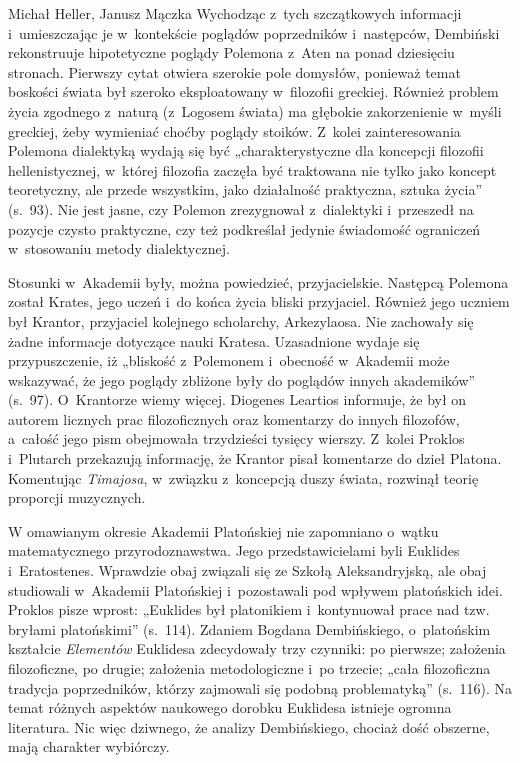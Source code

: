 \begin{recplenv}{Michał Heller, Janusz Mączka}
Wychodząc z~tych szczątkowych informacji i~umieszczając je w~kontekście poglądów
poprzedników i~następców, Dembiński rekonstruuje hipotetyczne poglądy Polemona z~Aten na ponad dziesięciu stronach.
Pierwszy cytat otwiera szerokie pole domysłów, ponieważ temat boskości świata był szeroko eksploatowany w~filozofii
greckiej. Również problem życia zgodnego z~naturą (z~Logosem świata) ma głębokie zakorzenienie w~myśli greckiej, żeby
wymieniać choćby poglądy stoików. Z~kolei zainteresowania Polemona dialektyką wydają się być „charakterystyczne dla
koncepcji filozofii hellenistycznej, w~której filozofia zaczęła być traktowana nie tylko jako koncept teoretyczny, ale
przede wszystkim, jako działalność praktyczna, sztuka życia” (s.~93). Nie jest jasne, czy Polemon zrezygnował
 z~dialektyki i~przeszedł na pozycje czysto praktyczne, czy też podkreślał jedynie świadomość ograniczeń w~stosowaniu
metody dialektycznej.

\enlargethispage{-.5\baselineskip}
Stosunki w~Akademii były, można powiedzieć, przyjacielskie. Następcą Polemona
został Krates, jego uczeń i~do końca życia bliski przyjaciel. Również jego uczniem był Krantor, przyjaciel kolejnego
scholarchy, Arkezylaosa. Nie zachowały się żadne informacje dotyczące nauki Kratesa. Uzasadnione wydaje się
przypuszczenie, iż „bliskość z~Polemonem i~obecność w~Akademii może wskazywać, że jego poglądy zbliżone były do
poglądów innych akademików” (s.~97). O~Krantorze wiemy więcej. Diogenes Leartios informuje, że był on autorem licznych
prac filozoficznych oraz komentarzy do innych filozofów, a~całość jego pism obejmowała trzydzieści tysięcy wierszy.
 Z~kolei Proklos i~Plutarch przekazują informację, że Krantor pisał komentarze do dzieł Platona. Komentując \textit{Timajosa},
 w~związku z~koncepcją duszy świata, rozwinął teorię proporcji muzycznych.


W omawianym okresie Akademii Platońskiej nie zapomniano o~wątku matematycznego
przyrodoznawstwa. Jego przedstawicielami byli Euklides i~Eratostenes. Wprawdzie obaj związali się ze Szkołą
Aleksandryjską, ale obaj studiowali w~Akademii Platońskiej i~pozostawali pod wpływem platońskich idei. Proklos pisze
wprost: „Euklides był platonikiem i~kontynuował prace nad tzw. bryłami platońskimi” (s.~114).
Zdaniem Bogdana Dembińskiego, o~platońskim kształcie \textit{Elementów} Euklidesa zdecydowały trzy
czynniki: po pierwsze; założenia filozoficzne, po drugie; założenia metodologiczne i~po trzecie; „cała filozoficzna
tradycja poprzedników, którzy zajmowali się podobną problematyką” (s.~116). Na temat różnych aspektów naukowego dorobku
Euklidesa istnieje ogromna literatura. Nic więc dziwnego, że analizy Dembińskiego, chociaż dość obszerne, mają
charakter wybiórczy.



\end{recplenv}
